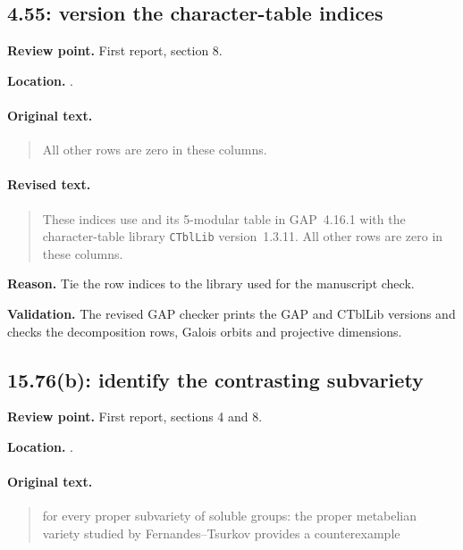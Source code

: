 \subsection{4.55: version the character-table indices}
\noindent\textbf{Review point.} First report, section 8.\par
\noindent\textbf{Location.} .

\paragraph{Original text.}
\begin{quote}\small
All other rows are zero in these columns.
\end{quote}

\paragraph{Revised text.}
\begin{quote}\small
These indices use  and its 5-modular
table in GAP~4.16.1 with the character-table library \texttt{CTblLib}
version~1.3.11. All other rows are zero in these columns.
\end{quote}

\noindent\textbf{Reason.} Tie the row indices to the library used for the manuscript check.

\noindent\textbf{Validation.} The revised GAP checker prints the GAP and CTblLib versions and checks the decomposition rows, Galois orbits and projective dimensions.

\subsection{15.76(b): identify the contrasting subvariety}
\noindent\textbf{Review point.} First report, sections 4 and 8.\par
\noindent\textbf{Location.} .

\paragraph{Original text.}
\begin{quote}\small
for every proper subvariety of soluble groups: the proper metabelian
variety studied by Fernandes--Tsurkov provides a counterexample
\end{quote}

